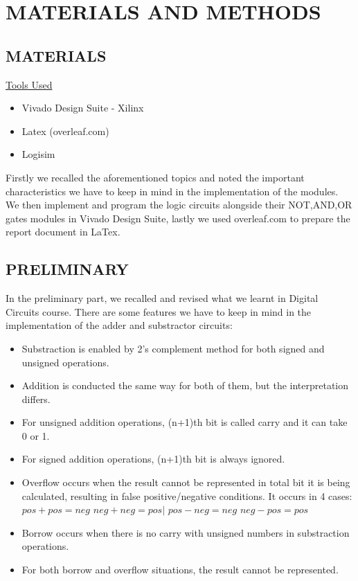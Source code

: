 \documentclass[pdftex,12pt,a4paper]{article}
\begin{document}
\section{MATERIALS AND METHODS}

\subsection{MATERIALS}
\underline{Tools Used}
\begin{itemize}
    \item {Vivado Design Suite - Xilinx}
    \item{Latex (overleaf.com)}
    \item{Logisim}
\end{itemize}
Firstly we recalled the aforementioned topics and noted the important characteristics we have to keep in mind in the implementation of the modules. We then implement and program the logic circuits alongside their NOT,AND,OR gates modules in Vivado Design Suite, lastly we used overleaf.com to prepare the report document in LaTex.

\subsection{PRELIMINARY}
In the preliminary part, we recalled and revised what we learnt in Digital Circuits course. There are some features we have to keep in mind in the implementation of the adder and substractor circuits:
\begin{itemize}
  \item Substraction is enabled by 2's complement method for both signed and unsigned operations.
  \item Addition is conducted the same way for both of them, but the interpretation differs.
  \item For unsigned addition operations, (n+1)th bit is called carry and it can take 0 or 1.
  \item For signed addition operations, (n+1)th bit is always ignored.
  \item Overflow occurs when the result cannot be represented in total bit it is being calculated, resulting in false positive/negative conditions. It occurs in 4 cases:
\(pos + pos = neg \)   \( neg + neg = pos |\)
\(pos - neg = neg \)   \( neg - pos = pos \)
  \item Borrow occurs when there is no carry with unsigned numbers in substraction operations. 
  \item For both borrow and overflow situations, the result cannot be represented.
\end{itemize}
\end{document}
